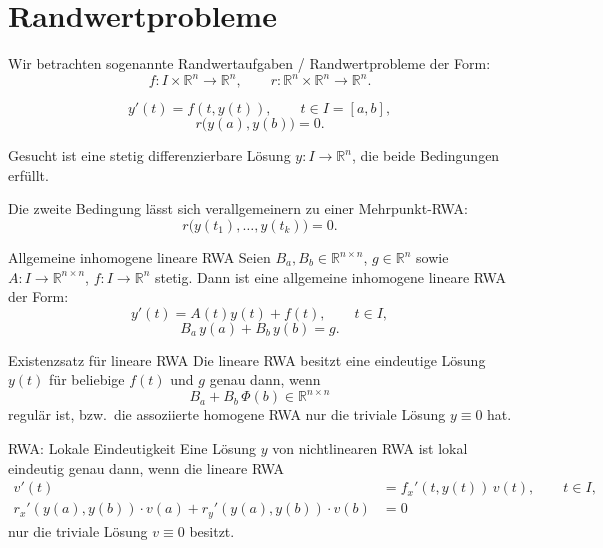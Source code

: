 \newpage
\section{Randwertprobleme}
\label{5.6}

\begin{bemerkungbox}
    Wir betrachten sogenannte Randwertaufgaben / Randwertprobleme der Form:
    $$
    f: I\times\mathbb{R}^n \to \mathbb{R}^n,\qquad r:\mathbb{R}^n\times\mathbb{R}^n\to\mathbb{R}^n.
    $$

    $$
    y'(t)=f(t,y(t)),\qquad t\in I=[a,b],
    $$
    $$
    r\bigl(y(a),y(b)\bigr)=0.
    $$

    Gesucht ist eine stetig differenzierbare Lösung $y: I\to\mathbb{R}^n$, die beide Bedingungen erfüllt.

    Die zweite Bedingung lässt sich verallgemeinern zu einer Mehrpunkt-RWA:
    $$
    r\bigl(y(t_1),\dots,y(t_k)\bigr)=0.
    $$    
\end{bemerkungbox}

\begin{definition}{Allgemeine inhomogene lineare RWA}
    Seien $B_a,B_b\in\mathbb{R}^{n\times n}$, $g\in\mathbb{R}^n$ sowie $A\colon I\to\mathbb{R}^{n\times n}$, $f\colon I\to\mathbb{R}^n$ stetig. Dann ist eine allgemeine inhomogene lineare RWA der Form:
    $$
    y'(t)=A(t)y(t)+f(t),\qquad t\in I,
    $$
    $$
    B_a\,y(a)+B_b\,y(b)=g.
    $$   
\end{definition}

\begin{satz}{Existenzsatz für lineare RWA}
    Die lineare RWA besitzt eine eindeutige Lösung $y(t)$ für beliebige $f(t)$ und $g$ genau dann, wenn
    $$
    B_a + B_b\,\Phi(b)\in\mathbb{R}^{n\times n}
    $$
    regulär ist, bzw.\ die assoziierte homogene RWA nur die triviale Lösung $y\equiv 0$ hat.   
\end{satz}

\begin{satz}{RWA: Lokale Eindeutigkeit}
    Eine Lösung $y$ von nichtlinearen RWA ist lokal eindeutig genau dann, wenn die lineare RWA
    \begin{align*}
    v'(t) &= f_x'(t,y(t))\,v(t), \qquad t\in I,\\
    r_x'(y(a),y(b))\cdot v(a) + r_y'(y(a),y(b))\cdot v(b) &= 0
    \end{align*}
    nur die triviale Lösung $v\equiv 0$ besitzt.    
\end{satz}

